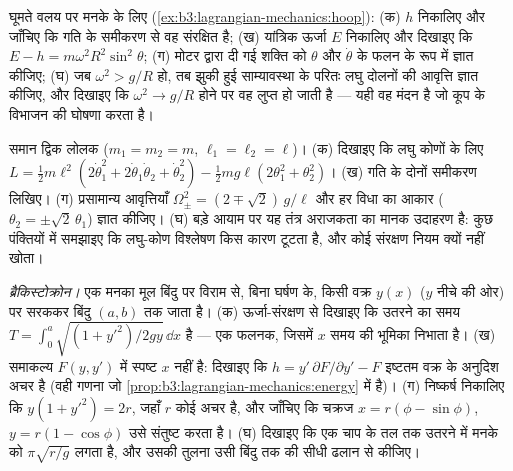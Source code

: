 \begin{exercise}[$\star\star$]\label{exo:b3:lagrangian-mechanics:9}
घूमते वलय पर मनके के लिए
(\cref{ex:b3:lagrangian-mechanics:hoop}): (क)  $h$ निकालिए
और जाँचिए कि गति के समीकरण से वह संरक्षित है; (ख) यांत्रिक ऊर्जा $E$
निकालिए और दिखाइए कि $E - h =
m\omega^2R^2\sin^2\theta$; (ग) मोटर द्वारा दी गई शक्ति को
$\theta$ और $\dot\theta$ के फलन के रूप में ज्ञात कीजिए; (घ) जब
$\omega^2 > g/R$ हो, तब झुकी हुई साम्यावस्था के परितः लघु दोलनों की
आवृत्ति ज्ञात कीजिए, और दिखाइए कि $\omega^2 \to g/R$ होने पर वह लुप्त
हो जाती है --- यही वह मंदन है जो कूप के विभाजन की घोषणा करता है।
\end{exercise}

\begin{exercise}[$\star\star\star$]\label{exo:b3:lagrangian-mechanics:10}
समान द्विक लोलक ($m_1 = m_2 = m$, $\ell_1 = \ell_2 = \ell$)।
(क) दिखाइए कि लघु कोणों के लिए $L = \tfrac12 m\ell^2(2\dot\theta_1^2 +
2\dot\theta_1\dot\theta_2 + \dot\theta_2^2) - \tfrac12 mg\ell(2
\theta_1^2 + \theta_2^2)$। (ख) गति के दोनों समीकरण लिखिए। (ग)
प्रसामान्य आवृत्तियाँ $\Omega_\pm^2 = (2 \mp \sqrt2)\,g/\ell$ और
हर विधा का आकार ($\theta_2 = \pm\sqrt2\,\theta_1$) ज्ञात कीजिए। (घ)
बड़े आयाम पर यह तंत्र अराजकता का मानक उदाहरण है: कुछ पंक्तियों में
समझाइए कि लघु-कोण विश्लेषण किस कारण टूटता है, और कोई संरक्षण नियम
क्यों नहीं खोता।
\end{exercise}

\begin{exercise}[$\star\star\star$]\label{exo:b3:lagrangian-mechanics:11}
\emph{ब्रैकिस्टोक्रोन।} एक मनका मूल बिंदु पर विराम से, बिना घर्षण के,
किसी वक्र $y(x)$ ($y$ नीचे की ओर) पर सरककर बिंदु $(a, b)$ तक जाता है।
(क) ऊर्जा-संरक्षण से दिखाइए कि उतरने का समय $T =
\int_0^a\sqrt{(1 + y'^2)/2gy}\,\dd x$ है --- एक फलनक, जिसमें $x$
समय की भूमिका निभाता है। (ख) समाकल्य $F(y, y')$ में स्पष्ट
$x$ नहीं है: दिखाइए कि $h = y'\,\partial F/\partial y' - F$ इष्टतम वक्र
के अनुदिश अचर है (वही गणना जो
\cref{prop:b3:lagrangian-mechanics:energy} में है)। (ग) निष्कर्ष
निकालिए कि $y(1 + y'^2) =
2r$, जहाँ $r$ कोई अचर है, और जाँचिए कि चक्रज $x = r(\phi -
\sin\phi)$, $y = r(1 - \cos\phi)$ उसे संतुष्ट करता है। (घ) दिखाइए कि
एक चाप के तल तक उतरने में मनके को $\pi\sqrt{r/g}$ लगता है, और उसकी
तुलना उसी बिंदु तक की सीधी ढलान से कीजिए।
\end{exercise}

